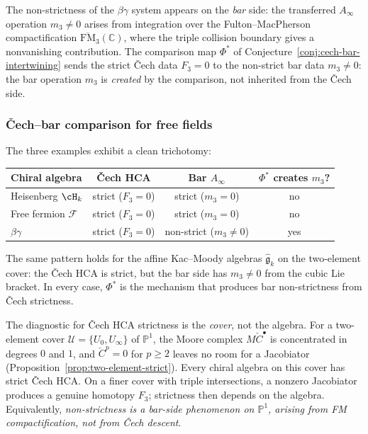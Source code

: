 The non-strictness of the $\beta\gamma$ system appears on the
\emph{bar} side: the transferred $A_\infty$ operation $m_3 \neq 0$
arises from integration over the Fulton--MacPherson
compactification $\overline{\mathrm{FM}}_3(\mathbb{C})$, where
the triple collision boundary gives a nonvanishing contribution.
The comparison map $\Phi^*$ of
Conjecture~\ref{conj:cech-bar-intertwining} sends the strict
\v{C}ech data $F_3 = 0$ to the non-strict bar data $m_3 \neq 0$:
the bar operation $m_3$ is \emph{created} by the comparison, not
inherited from the \v{C}ech side.

\subsubsection{\v{C}ech--bar comparison for free fields}
\label{subsec:cech-bar-free-field-comparison}

The three examples exhibit a clean trichotomy:

\begin{center}
\renewcommand{\arraystretch}{1.3}
\begin{tabular}{lccc}
\textbf{Chiral algebra}
 & \textbf{\v{C}ech HCA}
 & \textbf{Bar $A_\infty$}
 & \textbf{$\Phi^*$ creates $m_3$?} \\
\hline
Heisenberg $\cH_k$
 & strict ($F_3 = 0$)
 & strict ($m_3 = 0$)
 & no \\
Free fermion $\mathcal{F}$
 & strict ($F_3 = 0$)
 & strict ($m_3 = 0$)
 & no \\
$\beta\gamma$
 & strict ($F_3 = 0$)
 & non-strict ($m_3 \neq 0$)
 & yes \\
\end{tabular}
\end{center}

\noindent
The same pattern holds for the affine Kac--Moody algebras
$\widehat{\mathfrak{g}}_k$ on the two-element cover: the \v{C}ech
HCA is strict, but the bar side has $m_3 \neq 0$ from the cubic
Lie bracket. In every case, $\Phi^*$ is the mechanism that
produces bar non-strictness from \v{C}ech strictness.

\begin{remark}
\label{rem:hca-strictness-diagnostic}
The diagnostic for \v{C}ech HCA strictness is the \emph{cover},
not the algebra. For a two-element cover $\mathcal{U} =
\{U_0, U_\infty\}$ of $\mathbb{P}^1$, the Moore complex
$M\check{C}^\bullet$ is concentrated in degrees $0$ and $1$, and
$\check{C}^p = 0$ for $p \geq 2$ leaves no room for a
Jacobiator (Proposition~\textup{\ref{prop:two-element-strict}}).
Every chiral algebra on this cover has strict \v{C}ech HCA. On a
finer cover with triple intersections, a nonzero Jacobiator produces
a genuine homotopy $F_3$; strictness then depends on the algebra.
Equivalently,
\emph{non-strictness is a bar-side phenomenon on $\mathbb{P}^1$,
arising from FM compactification, not from \v{C}ech descent}.
\end{remark}

